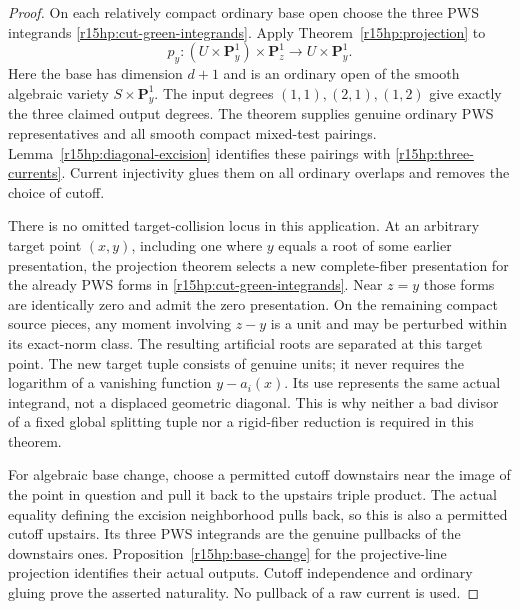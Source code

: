 \begin{proof}
On each relatively compact ordinary base open choose the three
PWS integrands \eqref{r15hp:cut-green-integrands}.
Apply Theorem~\ref{r15hp:projection} to
\[
 p_y:(U\times\mathbf P^1_y)\times\mathbf P^1_z
                                      \longrightarrow U\times\mathbf P^1_y.
\]
Here the base has dimension $d+1$ and is an ordinary open of the
smooth algebraic variety $S\times\mathbf P^1_y$.
The input degrees $(1,1),(2,1),(1,2)$ give exactly the three
claimed output degrees.  The theorem supplies genuine ordinary
PWS representatives and all smooth compact mixed-test pairings.
Lemma~\ref{r15hp:diagonal-excision} identifies these pairings
with \eqref{r15hp:three-currents}.  Current injectivity glues them
on all ordinary overlaps and removes the choice of cutoff.

There is no omitted target-collision locus in this application.
At an arbitrary target point $(x,y)$, including one where $y$
equals a root of some earlier presentation, the projection
theorem selects a new complete-fiber presentation for the
already PWS forms in \eqref{r15hp:cut-green-integrands}.
Near $z=y$ those forms are identically zero and admit the zero
presentation.  On the remaining compact source pieces, any
moment involving $z-y$ is a unit and may be perturbed within
its exact-norm class.  The resulting artificial roots are
separated at this target point.  The new target tuple consists
of genuine units; it never requires the logarithm of a
vanishing function $y-a_i(x)$.  Its use represents the same
actual integrand, not a displaced geometric diagonal.
This is why neither a bad divisor of a fixed global splitting
tuple nor a rigid-fiber reduction is required in this theorem.

For algebraic base change, choose a permitted cutoff downstairs
near the image of the point in question and pull it back to the
upstairs triple product.  The actual equality defining the
excision neighborhood pulls back, so this is also a permitted
cutoff upstairs.  Its three PWS integrands are the genuine
pullbacks of the downstairs ones.  Proposition~\ref{r15hp:base-change}
for the projective-line projection identifies their actual
outputs.  Cutoff independence and ordinary gluing prove the
asserted naturality.  No pullback of a raw current is used.
\end{proof}

